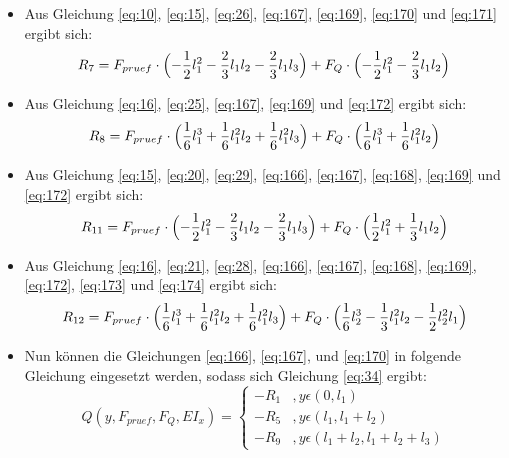 \begin{itemize}
\begin{equation}
	\end{equation}
	\item Aus Gleichung \ref{eq:10}, \ref{eq:15}, \ref{eq:26}, \ref{eq:167}, \ref{eq:169}, \ref{eq:170} und \ref{eq:171} ergibt sich:
	\begin{equation}\label{eq:172}
		R_{7}=F_{pruef}\cdot \Bigl(-\frac{1}{2} l_{1}^{2}-\frac{2}{3} l_{1}l_{2}-\frac{2}{3} l_{1}l_{3}\Bigr) + F_{Q}\cdot \Bigl(-\frac{1}{2} l_{1}^{2}-\frac{2}{3} l_{1}l_{2}\Bigr)
	\end{equation}
	\item Aus Gleichung \ref{eq:16}, \ref{eq:25}, \ref{eq:167}, \ref{eq:169} und \ref{eq:172} ergibt sich:
	\begin{equation}\label{eq:173}
		R_{8}=F_{pruef}\cdot \Bigl(\frac{1}{6} l_{1}^{3}+\frac{1}{6} l_{1}^{2}l_{2}+\frac{1}{6} l_{1}^{2}l_{3}\Bigr) + F_{Q}\cdot \Bigl(\frac{1}{6} l_{1}^{3}+\frac{1}{6} l_{1}^{2}l_{2}\Bigr)
	\end{equation}
	\item Aus Gleichung \ref{eq:15}, \ref{eq:20}, \ref{eq:29}, \ref{eq:166}, \ref{eq:167}, \ref{eq:168}, \ref{eq:169} und \ref{eq:172} ergibt sich:
	\begin{equation}\label{eq:174}
		R_{11}=F_{pruef}\cdot \Bigl(-\frac{1}{2} l_{1}^{2}-\frac{2}{3} l_{1}l_{2}-\frac{2}{3} l_{1}l_{3}\Bigr) + F_{Q}\cdot \Bigl(\frac{1}{2} l_{1}^{2}+\frac{1}{3} l_{1}l_{2}\Bigr)
	\end{equation}
	\item Aus Gleichung \ref{eq:16}, \ref{eq:21}, \ref{eq:28}, \ref{eq:166}, \ref{eq:167}, \ref{eq:168}, \ref{eq:169}, \ref{eq:172}, \ref{eq:173} und \ref{eq:174} ergibt sich:
	\begin{equation}\label{eq:175}
		R_{12}=F_{pruef}\cdot \Bigl(\frac{1}{6} l_{1}^{3}+\frac{1}{6} l_{1}^{2}l_{2}+\frac{1}{6} l_{1}^{2}l_{3}\Bigr) + F_{Q}\cdot \Bigl(\frac{1}{6} l_{2}^{3}-\frac{1}{3} l_{1}^{2}l_{2}-\frac{1}{2} l_{2}^{2}l_{1}\Bigr)
	\end{equation}
	\item Nun können die Gleichungen \ref{eq:166}, \ref{eq:167}, und \ref{eq:170} in folgende Gleichung eingesetzt werden, sodass sich Gleichung \ref{eq:34} ergibt:
	\begin{equation}
		Q(y,F_{pruef},F_{Q},EI_{x})=\left\{\begin{array}{ll}
			-R_{1}&,y\epsilon (0,l_{1})\\
			-R_{5}&,y\epsilon (l_{1}, l_{1}+l_{2})\\
			-R_{9}&,y\epsilon (l_{1}+l_{2}, l_{1}+l_{2}+l_{3})
		\end{array}\right.

\end{equation}
\end{itemize}
